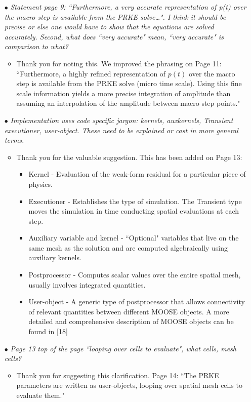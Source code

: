 \documentclass[11pt]{letter}
\newcommand{\done}{$\bullet$}
\newcommand{\easy}[1]{{\textit{#1}}}
\newcommand{\medm}[1]{{\textit{#1}}}
\begin{document}
\begin{itemize}
\item[\done] \medm{ Statement page 9: ``Furthermore, a very accurate representation of p(t) over the macro step is available from the PRKE solve…". I think it should be precise or else one would have to show that the equations are solved accurately. Second, what does ``very accurate" mean, ``very accurate" is comparison to what? }
\begin{itemize}
\item Thank you for noting this. We improved the phrasing on Page 11: ``Furthermore, a highly refined representation of $p(t)$ over the macro step is available from the PRKE solve (micro time scale). Using this fine scale information yields a more precise integration of amplitude than assuming an interpolation of the amplitude between macro step points."
\end{itemize}

\item[\done] \medm{ Implementation uses code specific jargon: kernels, auxkernels, Transient executioner, user-object. These need to be explained or cast in more general terms. }
\begin{itemize}
\item Thank you for the valuable suggestion. This has been added on Page 13:
\begin{itemize}
\item Kernel - Evaluation of the weak-form residual for a particular piece of physics.
\item Executioner - Establishes the type of simulation. The Transient type moves the simulation in time conducting spatial evaluations at each step.
\item Auxiliary variable and kernel - ``Optional" variables that live on the same mesh as the solution and are computed algebraically using auxiliary kernels. 
\item Postprocessor - Computes scalar values over the entire spatial mesh, usually involves integrated quantities.
\item User-object - A generic type of postprocessor that allows connectivity of relevant quantities between different MOOSE objects.
A more detailed and comprehensive description of MOOSE objects can be found in [18]
\end{itemize}
\end{itemize}

\item[\done] \easy{ Page 13 top of the page ``looping over cells to evaluate", what cells, mesh cells? }
\begin{itemize}
\item Thank you for suggesting this clarification. Page 14: ``The PRKE parameters are written as user-objects, looping over spatial mesh cells to evaluate them."
\end{itemize}


\end{itemize}
\end{document}
